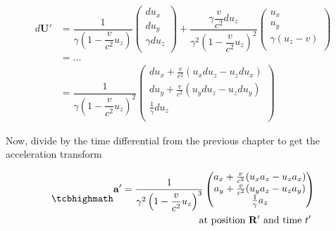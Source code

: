 \begin{equation}
	\begin{aligned}
		d\mathbf{U'} & = \dfrac{1}{\gamma\left(1- \dfrac{v}{c^2} u_z\right) }
		\begin{pmatrix}
			du_x        \\
			du_y        \\
			\gamma du_z \\
		\end{pmatrix}
		+ \dfrac{\gamma \dfrac{v}{c^2} du_z}{\gamma^2\left(1- \dfrac{v}{c^2} u_z\right)^2 }
		\begin{pmatrix}
			u_x                             \\
			u_y                             \\
			\gamma \left( u_z  - v  \right) \\
		\end{pmatrix}                                          \\
		             & = ...                                                     \\
		             & =  \dfrac{1}{\gamma\left(1- \dfrac{v}{c^2} u_z\right)^2 }
		\begin{pmatrix}
			du_x + \frac{v}{c^2}( u_x du_z - u_z du_x) \\
			du_y + \frac{v}{c^2}( u_y du_z - u_z du_y) \\
			\frac{1}{\gamma} du_z                      \\
		\end{pmatrix}
	\end{aligned}
\end{equation}

Now, divide by the time differential from the previous chapter to get the acceleration transform

\begin{equation}
	\mhl{
		\begin{aligned}
			\mathbf{a'} =  \dfrac{1}{\gamma^2\left(1- \dfrac{v}{c^2} u_z\right)^3 }
			\begin{pmatrix}
				a_x + \frac{v}{c^2}(u_x a_z - u_z a_x) \\
				a_y + \frac{v}{c^2}(u_y a_z - u_z a_y) \\
				\frac{1}{\gamma} a_z                   \\
			\end{pmatrix}
			\\
			\text{at position $\mathbf{R'}$ and time $t'$ }
		\end{aligned}
	}
\end{equation}

